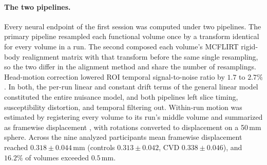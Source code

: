 



\paragraph{The two pipelines.}
Every neural endpoint of the first session was computed under two pipelines. The primary pipeline resampled each functional volume once by a transform identical for every volume in a run. The second composed each volume's MCFLIRT rigid-body realignment matrix with that transform before the same single resampling, so the two differ in the alignment method and share the number of resamplings. Head-motion correction lowered ROI temporal signal-to-noise ratio by $1.7$ to $2.7\%$. In both, the per-run linear and constant drift terms of the general linear model constituted the entire nuisance model, and both pipelines left slice timing, susceptibility distortion, and temporal filtering out. Within-run motion was estimated by registering every volume to its run's middle volume and summarized as framewise displacement \parencite{power2012}, with rotations converted to displacement on a 50\,mm sphere. Across the nine analyzed participants mean framewise displacement reached $0.318 \pm 0.044$\,mm (controls $0.313 \pm 0.042$, CVD $0.338 \pm 0.046$), and $16.2\%$ of volumes exceeded $0.5$\,mm.

